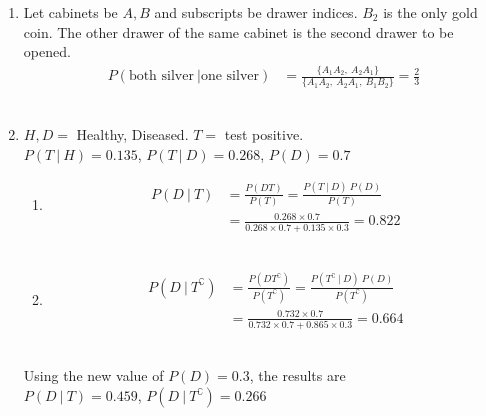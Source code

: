 \begin{enumerate}
	\item Let cabinets be $ A, B $ and subscripts be drawer indices. $ B_2 $ is the only gold coin. The other drawer of the same cabinet is the second drawer to be opened. \\
	\begin{align}
		P(\text{both silver}\ | \text{one silver}) &= \frac{\{ A_1 A_2,\ A_2 A_1 \}}{\{ A_1 A_2,\ A_2 A_1,\ B_1 B_2 \}} = \frac{2}{3}
	\end{align}\\
	
	\item $ H, D = $ Healthy, Diseased. $ T =  $ test positive. \\
	$ P(T\ |\ H) = 0.135 $, $ P(T\ |\ D) = 0.268 $, $ P(D) = 0.7 $\\
	
	\begin{enumerate}
		\item \begin{align}
			P(D\ |\ T) &= \frac{P(DT)}{P(T)} = \frac{P(T\ |\ D) \ P(D)}{P(T)} \\
			&= \frac{0.268 \times 0.7}{0.268 \times 0.7 + 0.135 \times 0.3} = 0.822
		\end{align}\\
		
		\item \begin{align}
			P(D\ |\ T^\complement) &= \frac{P(DT^\complement)}{P(T^\complement)} = \frac{P(T^\complement\ |\ D) \ P(D)}{P(T^\complement)} \\
			&= \frac{0.732 \times 0.7}{0.732 \times 0.7 + 0.865 \times 0.3} = 0.664
		\end{align} \\
	\end{enumerate}
	
	Using the new value of $ P(D) = 0.3 $, the results are \\
	$ P(D\ |\ T) =  0.459$, $ P(D\ |\ T^\complement) = 0.266$\\
	

\end{enumerate}
